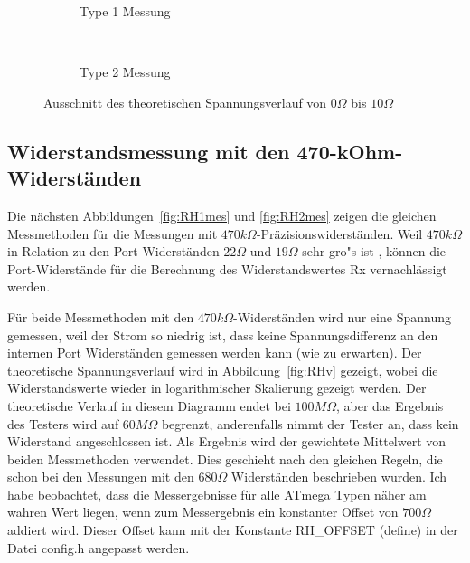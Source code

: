 \begin{figure}[H]
  \begin{subfigure}[b]{9cm}
    \centering
    \resizebox{9cm}{!}{}
    \caption{Type 1 Messung}
    \label{fig:RLvlow}
  \end{subfigure}
  ~
  \begin{subfigure}[b]{9cm}
    \centering
    \resizebox{9cm}{!}{}
    \caption{Type 2 Messung}
    \label{fig:RLvhigh}
  \end{subfigure}
  \caption{Ausschnitt des theoretischen Spannungsverlauf von \(0\Omega\) bis \(10\Omega\)}
\end{figure}


\subsection{Widerstandsmessung mit den 470-kOhm-Widerst\"anden}
Die n\"achsten Abbildungen~\ref{fig:RH1mes} und \ref{fig:RH2mes} zeigen die gleichen Messmethoden f\"ur die Messungen mit
 \(470k\Omega\)-Pr\"azisionswiderst\"anden.
Weil \(470k\Omega\) in Relation zu den Port-Widerst\"anden \(22\Omega\) und \(19\Omega\) sehr gro"s ist ,
k\"onnen die Port-Widerst\"ande f\"ur die Berechnung des Widerstandswertes Rx vernachl\"assigt werden.

F\"ur beide Messmethoden mit den \(470k\Omega\)-Widerst\"anden wird nur eine Spannung gemessen, weil der Strom
so niedrig ist, dass keine Spannungsdifferenz an den internen Port Widerst\"anden gemessen werden kann (wie zu erwarten).
Der theoretische Spannungsverlauf wird in Abbildung~\ref{fig:RHv} gezeigt, wobei die Widerstandswerte wieder in
logarithmischer Skalierung gezeigt werden.
Der theoretische Verlauf in diesem Diagramm endet bei \(100M\Omega\), aber das Ergebnis des Testers wird auf
 \(60M\Omega\) begrenzt, anderenfalls nimmt der Tester an, dass kein Widerstand angeschlossen ist.
Als Ergebnis wird der gewichtete Mittelwert von beiden Messmethoden verwendet. Dies geschieht nach den gleichen Regeln, die schon bei
den Messungen mit den  \(680\Omega\) Widerst\"anden beschrieben wurden.
Ich habe beobachtet, dass die Messergebnisse f\"ur alle ATmega Typen  n\"aher am wahren Wert liegen, wenn zum Messergebnis
ein konstanter Offset von \(700\Omega\) addiert wird.
Dieser Offset kann mit der Konstante RH\_OFFSET (define) in der Datei config.h angepasst werden.

